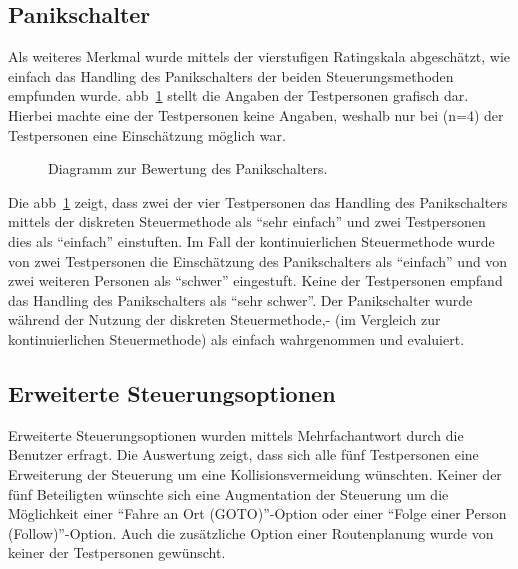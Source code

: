 \subsection{Panikschalter}
Als weiteres Merkmal wurde mittels der \og vierstufigen Ratingskala abgeschätzt, wie einfach das Handling des Panikschalters der beiden Steuerungsmethoden empfunden wurde. \acl{abb}~\ref{fig:panikschalter} stellt die Angaben der Testpersonen grafisch dar. Hierbei machte eine der Testpersonen keine Angaben, weshalb nur bei (n=4) der Testpersonen eine Einschätzung möglich war. 
\begin{figure}[hbt]
\centering
{}
\caption{Diagramm zur Bewertung des Panikschalters.}
\label{fig:panikschalter}
\end{figure}

Die \acl{abb}~\ref{fig:panikschalter} zeigt, dass zwei der vier Testpersonen das Handling des Panikschalters mittels der diskreten Steuermethode als \enquote{sehr einfach} und zwei Testpersonen dies als \enquote{einfach} einstuften. Im Fall der kontinuierlichen Steuermethode wurde von zwei Testpersonen die Einschätzung \bzgl des Panikschalters als \enquote{einfach} und von zwei weiteren Personen als \enquote{schwer} eingestuft. Keine der Testpersonen empfand das Handling des Panikschalters als \enquote{sehr schwer}. Der Panikschalter wurde während der Nutzung der diskreten Steuermethode,- (im Vergleich zur kontinuierlichen Steuermethode) als einfach wahrgenommen und evaluiert.

\subsection{Erweiterte Steuerungsoptionen}
Erweiterte Steuerungsoptionen wurden mittels Mehrfachantwort durch die Benutzer erfragt.
Die Auswertung zeigt, dass sich alle fünf Testpersonen eine Erweiterung der Steuerung um eine Kollisionsvermeidung wünschten. Keiner der fünf Beteiligten wünschte sich eine Augmentation der Steuerung um die Möglichkeit einer \enquote{Fahre an Ort (GOTO)}-Option oder einer \enquote{Folge einer Person (Follow)}-Option. Auch die zusätzliche Option einer Routenplanung wurde von keiner der Testpersonen gewünscht. 

